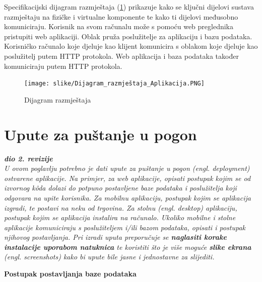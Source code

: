 			 Specifikacijski dijagram razmještaja (\ref{fig:dijagram_razmjestaja1}) prikazuje kako se ključni dijelovi sustava razmještaju na fizičke i virtualne komponente te kako ti dijelovi međusobno komuniciraju.
			 Korisnik na svom računalu može s pomoću web preglednika pristupiti web aplikaciji. Oblak pruža poslužitelje za aplikaciju i bazu podataka. Korisničko računalo koje djeluje kao klijent komunicira s oblakom koje djeluje kao poslužitelj putem HTTP protokola. Web aplikacija i baza podataka također komuniciraju putem HTTP protokola.
			 
			 \begin{figure}[H]
				\texttt{[image: slike/Dijagram\_razmještaja\_Aplikacija.PNG]} %
				\centering
				\caption{Dijagram razmještaja}
				\label{fig:dijagram_razmjestaja1}
			\end{figure}
			
			\eject 
		
		\section{Upute za puštanje u pogon}
		
			\textbf{\textit{dio 2. revizije}}\\
		
			 \textit{U ovom poglavlju potrebno je dati upute za puštanje u pogon (engl. deployment) ostvarene aplikacije. Na primjer, za web aplikacije, opisati postupak kojim se od izvornog kôda dolazi do potpuno postavljene baze podataka i poslužitelja koji odgovara na upite korisnika. Za mobilnu aplikaciju, postupak kojim se aplikacija izgradi, te postavi na neku od trgovina. Za stolnu (engl. desktop) aplikaciju, postupak kojim se aplikacija instalira na računalo. Ukoliko mobilne i stolne aplikacije komuniciraju s poslužiteljem i/ili bazom podataka, opisati i postupak njihovog postavljanja. Pri izradi uputa preporučuje se \textbf{naglasiti korake instalacije uporabom natuknica} te koristiti što je više moguće \textbf{slike ekrana} (engl. screenshots) kako bi upute bile jasne i jednostavne za slijediti.}


\textbf{Postupak postavljanja baze podataka}

